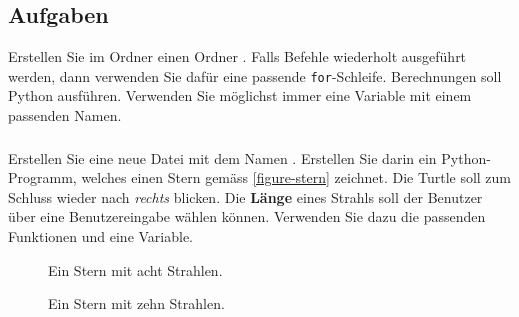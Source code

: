 \subsection{Aufgaben}

Erstellen Sie im Ordner  einen Ordner  . Falls Befehle wiederholt ausgeführt werden, dann verwenden Sie dafür eine passende \lstinline{for}-Schleife. Berechnungen soll Python ausführen. Verwenden Sie möglichst immer eine Variable mit einem passenden Namen.

\subsubsection{}

Erstellen Sie eine neue Datei mit dem Namen . Erstellen Sie darin ein Python-Programm, welches einen Stern gemäss \autoref{figure-stern} zeichnet. Die Turtle soll zum Schluss wieder nach \textit{rechts} blicken. Die \textbf{Länge} eines Strahls soll der Benutzer über eine Benutzereingabe wählen können. Verwenden Sie dazu die passenden Funktionen und eine Variable.

\begin{figure}[htb]
\centering
\begin{minipage}[c]{0.45\linewidth}
\centering
{}
\caption{Ein Stern mit acht Strahlen.}
\label{figure-stern}
\end{minipage}
\hfill
\begin{minipage}[c]{0.45\linewidth}
\centering
{}
\caption{Ein Stern mit zehn Strahlen.}
\label{figure-farbiger-stern-input}
\end{minipage}
\end{figure}

